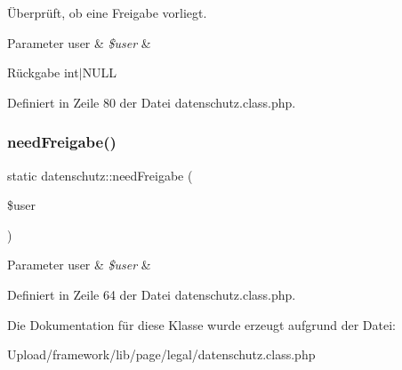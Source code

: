 Überprüft, ob eine Freigabe vorliegt. 
\begin{DoxyParams}[1]{Parameter}
user & {\em \$user} & \\
\hline
\end{DoxyParams}
\begin{DoxyReturn}{Rückgabe}
int$\vert$\+N\+U\+LL 
\end{DoxyReturn}


Definiert in Zeile 80 der Datei datenschutz.\+class.\+php.

\mbox{\label{classdatenschutz_a9b42f8bbc5c58d54f76809f369c31b84}} 
\subsubsection{\texorpdfstring{need\+Freigabe()}{needFreigabe()}}
{\footnotesize\ttfamily static datenschutz\+::need\+Freigabe (\begin{DoxyParamCaption}\item[{}]{\$user }\end{DoxyParamCaption})\hspace{0.3cm}{\ttfamily [static]}}


\begin{DoxyParams}[1]{Parameter}
user & {\em \$user} & \\
\hline
\end{DoxyParams}


Definiert in Zeile 64 der Datei datenschutz.\+class.\+php.



Die Dokumentation für diese Klasse wurde erzeugt aufgrund der Datei\+:\begin{DoxyCompactItemize}
\item 
Upload/framework/lib/page/legal/datenschutz.\+class.\+php\end{DoxyCompactItemize}
